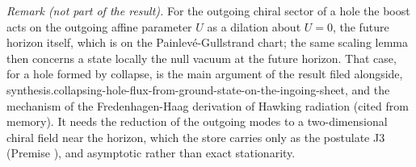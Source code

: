 \emph{Remark (not part of the result).} For the outgoing chiral sector of a hole the boost acts on the outgoing affine parameter $U$ as a dilation about $U = 0$, the future horizon itself, which is on the Painlev\'e-Gullstrand chart; the same scaling lemma then concerns a state locally the null vacuum at the future horizon. That case, for a hole formed by collapse, is the main argument of the result filed alongside, synthesis.collapsing-hole-flux-from-ground-state-on-the-ingoing-sheet, and the mechanism of the Fredenhagen-Haag derivation of Hawking radiation (cited from memory). It needs the reduction of the outgoing modes to a two-dimensional chiral field near the horizon, which the store carries only as the postulate J3 (Premise ), and asymptotic rather than exact stationarity.

